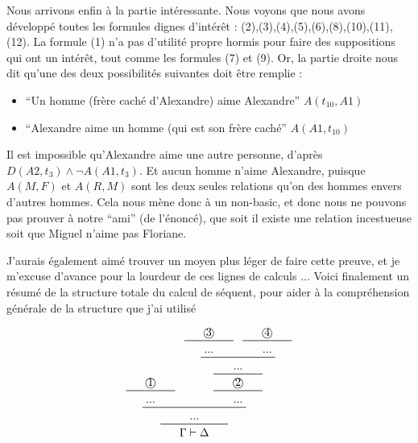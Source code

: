 \documentclass[10pt]{extarticle}
\begin{document}
Nous arrivons enfin à la partie intéressante. Nous voyons que nous avons développé toutes les formules dignes d'intérêt : (2),(3),(4),(5),(6),(8),(10),(11),(12). La formule (1) n'a pas d'utilité propre hormis pour faire des suppositions qui ont un intérêt, tout comme les formules (7) et (9). Or, la partie droite nous dit qu'une des deux possibilités suivantes doit être remplie :

\begin{itemize}
\item ``Un homme (frère caché d'Alexandre) aime Alexandre'' $A(t_{10},A1)$
\item ``Alexandre aime un homme (qui est son frère caché'' $A(A1,t_{10})$
\end{itemize}

Il est impossible qu'Alexandre aime une autre personne, d'après $D(A2,t_3) \land \neg A(A1,t_3)$. Et aucun homme n'aime Alexandre, puisque $A(M,F)$ et $A(R,M)$ sont les deux seules relations qu'on des hommes envers d'autres hommes. Cela nous mène donc à un non-basic, et donc nous ne pouvons pas prouver à notre ``ami'' (de l'énoncé), que soit il existe une relation incestueuse soit que Miguel n'aime pas Floriane.

\vspace{0.6cm}

J'aurais également aimé trouver un moyen plus léger de faire cette preuve, et je m'excuse d'avance pour la lourdeur de ces lignes de calculs ... Voici finalement un résumé de la structure totale du calcul de séquent, pour aider à la compréhension générale de la structure que j'ai utilisé

\begin{displaymath}
\prftree[r]{}
{\prftree[r]{}
{\prftree[r]{}
{\;\;\;\;\;\text{\textcircled{1}}\;\;\;\;\;}
{...}}
{\prftree[r]{}
{\prftree[r]{}
{\prftree[r]{}
{\prftree[r]{}
{\;\;\;\;\;\text{\textcircled{3}}\;\;\;\;\;}
{...}}
{\prftree[r]{}
{\;\;\;\;\;\text{\textcircled{4}}\;\;\;\;\;}
{...}}
{...}}
{\;\;\;\;\;\text{\textcircled{2}}\;\;\;\;\;}}
{...}}
{...}}
{\;\;\;\;\;\Gamma \vdash \Delta\;\;\;\;\;}
\end{displaymath}



\end{document}
